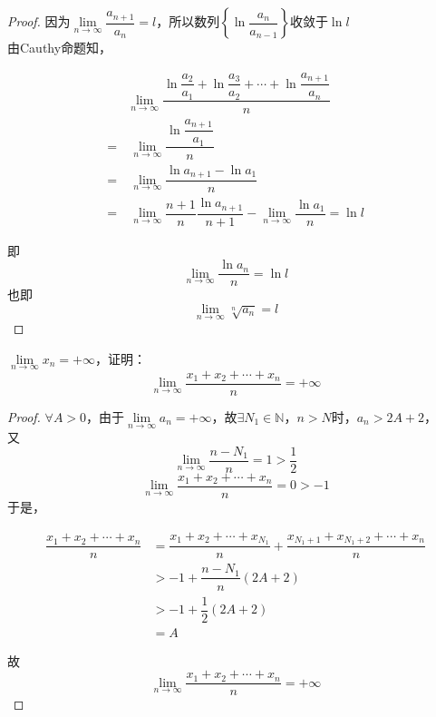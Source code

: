 \begin{proof}

    因为$\lim\limits_{n\to\infty}{\dfrac{a_{n+1}}{a_n}}=l$，所以数列$\left\{\ln{\dfrac{a_n}{a_{n - 1}}}\right\}$收敛于$\ln{l}$ \\
    由\textup{Cauthy}命题知，
    
    \begin{align*}
        & \lim\limits_{n\to\infty}{\dfrac{\ln{\dfrac{a_2}{a_1}} + \ln{\dfrac{a_3}{a_2}} + \cdots + \ln{\dfrac{a_{n + 1}}{a_n}}}{n}} \\
        = & \ \lim\limits_{n\to\infty}{\dfrac{\ln{\dfrac{a_{n + 1}}{a_1}}}{n}} \\
        = & \ \lim\limits_{n\to\infty}{\dfrac{\ln{a_{n + 1} - \ln{a_1}}}{n}} \\
        = & \ \lim\limits_{n\to\infty}{\dfrac{n + 1}{n}\dfrac{\ln{a_{n + 1}}}{n + 1}} - \lim\limits_{n\to\infty}{\dfrac{\ln{a_1}}{n}} = \ln{l}
    \end{align*}

    即
    $$\lim\limits_{n\to\infty}{\dfrac{\ln{a_n}}{n}} = \ln{l}$$
    也即
    $$\lim\limits_{n\to\infty}{\sqrt[n]{a_n}}=l$$

\end{proof}

\begin{proposition}

    $\lim\limits_{n\to\infty}{x_n} = +\infty$，证明：
    $$\lim\limits_{n\to\infty}{\dfrac{x_1 + x_2 + \cdots + x_n}{n}} = +\infty$$

\end{proposition}

\begin{proof} 

    $\forall A > 0$，由于$\lim\limits_{n\to\infty}{a_n} = +\infty$，故$\exists N_1 \in \mathbb{N}$，$n>N$时，$a_n > 2A + 2$，\\
    又
    $$\lim\limits_{n\to\infty}{\dfrac{n-N_1}{n}} = 1 > \dfrac{1}{2}$$
    $$\lim\limits_{n\to\infty}{\dfrac{x_1 + x_2 + \cdots + x_n}{n}} = 0 > -1$$
    于是，

    \begin{align*}
        \dfrac{x_1 + x_2 + \cdots + x_n}{n} & = \dfrac{x_1 + x_2 + \cdots + x_{N_1}}{n} + \dfrac{x_{N_1+1} + x_{N_1+2} + \cdots + x_n}{n} \\
        & > -1 + \dfrac{n-N_1}{n}(2A+2) \\
        & > -1 + \dfrac{1}{2}(2A + 2) \\
        & = A 
    \end{align*}

    故
    $$\lim\limits_{n\to\infty}{\dfrac{x_1 + x_2 + \cdots + x_n}{n}} = +\infty$$
    
\end{proof} 

